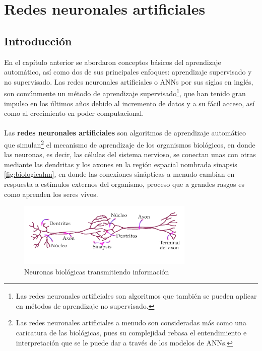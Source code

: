 \chapter{Redes neuronales artificiales}\label{ch:NNBasics}
\section{Introducción}

En el capítulo anterior se abordaron conceptos básicos del aprendizaje automático, así como dos de sus principales enfoques: aprendizaje supervisado y no supervisado. Las redes neuronales artificiales o \acs{ANN}s por sus siglas en inglés, son comúnmente un método de aprendizaje supervisado\footnote{Las redes neuronales artificiales son algoritmos que también se pueden aplicar en métodos de aprendizaje no supervisado.}, que han tenido gran impulso en los últimos años debido al incremento de datos y a su fácil acceso, así como al crecimiento en poder computacional.
\\
\\
Las \textbf{redes neuronales artificiales}  son algoritmos de aprendizaje automático que simulan\footnote{Las redes neuronales artificiales a menudo son consideradas más como una caricatura de las biológicas, pues su complejidad rebasa el entendimiento e interpretación que se le puede dar a través de los modelos de \acs{ANN}s.} el mecanismo de aprendizaje de los organismos biológicos, en donde las neuronas, es decir, las células del sistema nervioso, se conectan unas con otras mediante las dendritas y los axones en la región espacial nombrada sinapsis \autoref{fig:biologicalnn}, en donde las conexiones sinápticas a menudo cambian en respuesta a estímulos externos del organismo, proceso que a grandes rasgos es como aprenden los seres vivos. \cite{Nielsen:2018}

\begin{figure}[hb]
  \centering
  \includegraphics[width=0.75\textwidth]{./img/BioloNN.png}
  \caption{Neuronas biológicas transmitiendo información \cite{Gardell:2010}}
  \label{fig:biologicalnn}
\end{figure}


